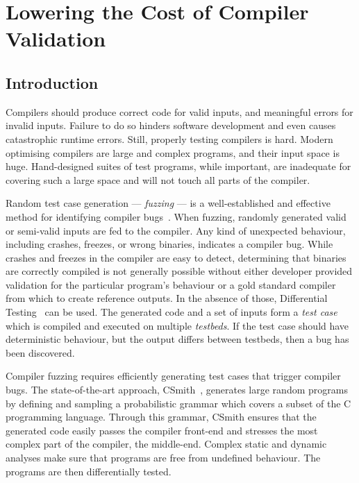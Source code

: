 \chapter{Lowering the Cost of Compiler Validation}
\label{chap:deepsmith}


\section{Introduction}

Compilers should produce correct code for valid inputs, and meaningful errors for invalid inputs. Failure to do so hinders software development and even causes catastrophic runtime errors. Still, properly testing compilers is hard. Modern optimising compilers are large and complex programs, and their input space is huge. Hand-designed suites of test programs, while important, are inadequate for covering such a large space and will not touch all parts of the compiler.

Random test case generation --- \emph{fuzzing} --- is a well-established and effective method for identifying compiler bugs~\cite{Chen2014a,Chen2013,Kossatchev2005}. When fuzzing, randomly generated valid or semi-valid inputs are fed to the compiler. Any kind of unexpected behaviour, including crashes, freezes, or wrong binaries, indicates a compiler bug. While crashes and freezes in the compiler are easy to detect, determining that binaries are correctly compiled is not generally possible without either developer provided validation for the particular program's behaviour or a gold standard compiler from which to create reference outputs. In the absence of those, Differential Testing~\cite{McKeeman1998} can be used. The generated code and a set of inputs form a \emph{test case} which is compiled and executed on multiple \emph{testbeds}. If the test case should have deterministic behaviour, but the output differs between testbeds, then a bug has been discovered.

Compiler fuzzing requires efficiently generating test cases that trigger compiler bugs. The state-of-the-art approach, CSmith~\cite{Yang2011}, generates large random programs by defining and sampling a probabilistic grammar which covers a subset of the C programming language. Through this grammar, CSmith ensures that the generated code easily passes the compiler front-end and stresses the most complex part of the compiler, the middle-end. Complex static and dynamic analyses make sure that programs are free from undefined behaviour. The programs are then differentially tested.

